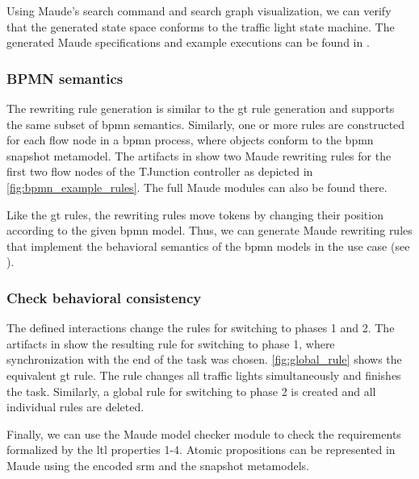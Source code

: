 \documentclass{jot}
\begin{document}


Using Maude's search command and search graph visualization, we can verify that the generated state space conforms to the traffic light state machine.
The generated Maude specifications and example executions can be found in \cite{krauterArtifactsBehavioralConsistency2022}.

\subsubsection{BPMN semantics}
The rewriting rule generation is similar to the \gls*{gt} rule generation and supports the same subset of \gls*{bpmn} semantics.
Similarly, one or more rules are constructed for each flow node in a \gls*{bpmn} process, where objects conform to the \gls*{bpmn} snapshot metamodel.
The artifacts in \cite{krauterArtifactsBehavioralConsistency2022} show two Maude rewriting rules for the first two flow nodes of the TJunction controller as depicted in \cref{fig:bpmn_example_rules}.
The full Maude modules can also be found there.

Like the \gls*{gt} rules, the rewriting rules move tokens by changing their position according to the given \gls*{bpmn} model.
Thus, we can generate Maude rewriting rules that implement the behavioral semantics of the \gls*{bpmn} models in the use case (see \cite{krauterArtifactsBehavioralConsistency2022}).


\subsubsection{Check behavioral consistency}
The defined interactions change the rules for switching to phases 1 and 2.
The artifacts in \cite{krauterArtifactsBehavioralConsistency2022} show the resulting rule for switching to phase 1, where synchronization with the end of the task was chosen.
\autoref{fig:global_rule} shows the equivalent \gls*{gt} rule.
The rule changes all traffic lights simultaneously and finishes the task.
Similarly, a global rule for switching to phase 2 is created and all individual rules are deleted.

Finally, we can use the Maude model checker module to check the requirements formalized by the \gls*{ltl} properties 1-4.
Atomic propositions can be represented in Maude using the encoded \gls*{srm} and the snapshot metamodels.
\end{document}
